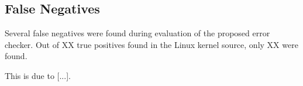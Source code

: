 \subsection{False Negatives}

Several false negatives were found during evaluation of the proposed error checker. Out of XX true positives found in the Linux kernel source, only XX were found.

\newpar This is due to  [...].